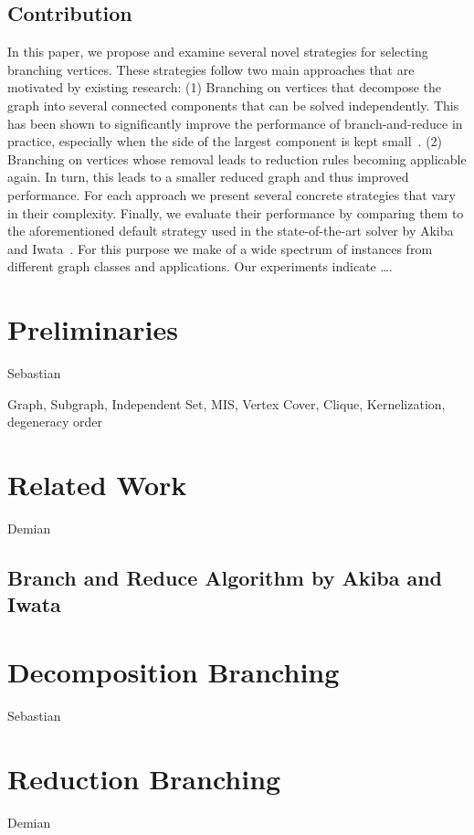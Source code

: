 \documentclass[a4paper,UKenglish,cleveref, autoref, thm-restate]{lipics-v2021}
\begin{document}
\subsection{Contribution}
In this paper, we propose and examine several novel strategies for selecting branching vertices. These strategies follow two main approaches that are motivated by existing research: (1) Branching on vertices that decompose the graph into several connected components that can be solved independently. This has been shown to significantly improve the performance of branch-and-reduce in practice, especially when the side of the largest component is kept small~\cite{alsahafy2020computing}. (2) Branching on vertices whose removal leads to reduction rules becoming applicable again. In turn, this leads to a smaller reduced graph and thus improved performance. For each approach we present several concrete strategies that vary in their complexity. Finally, we evaluate their performance by comparing them to the aforementioned default strategy used in the state-of-the-art solver by Akiba and Iwata~\cite{AkibaIwata}. For this purpose we make of a wide spectrum of instances from different graph classes and applications. Our experiments indicate \ldots.

\section{Preliminaries}
Sebastian

Graph, Subgraph, Independent Set, MIS, Vertex Cover, Clique, Kernelization,
degeneracy order

\section{Related Work}
Demian

\subsection{Branch and Reduce Algorithm by Akiba and Iwata~\cite{DBLP:journals/tcs/AkibaI16}}

\section{Decomposition Branching}
Sebastian

\section{Reduction Branching}
Demian
\end{document}
